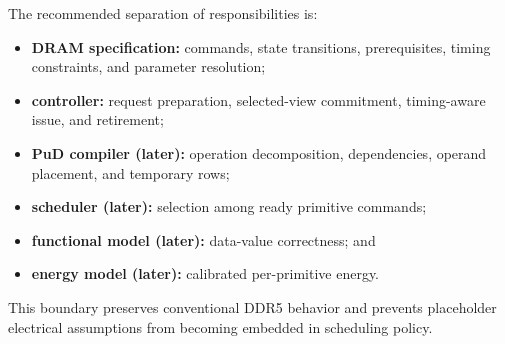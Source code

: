 \documentclass[9pt,twocolumn]{extarticle}
\begin{document}
The recommended separation of responsibilities is:

\begin{itemize}
  \item \textbf{DRAM specification:} commands, state transitions, prerequisites,
        timing constraints, and parameter resolution;
  \item \textbf{controller:} request preparation, selected-view commitment,
        timing-aware issue, and retirement;
  \item \textbf{PuD compiler (later):} operation decomposition, dependencies,
        operand placement, and temporary rows;
  \item \textbf{scheduler (later):} selection among ready primitive commands;
  \item \textbf{functional model (later):} data-value correctness; and
  \item \textbf{energy model (later):} calibrated per-primitive energy.
\end{itemize}

This boundary preserves conventional DDR5 behavior and prevents placeholder
electrical assumptions from becoming embedded in scheduling policy.
\end{document}
